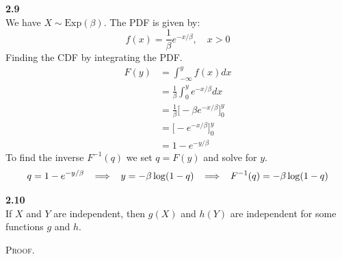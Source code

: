 \bigskip\noindent
\textbf{2.9}\\  %
We have $X\sim \text{Exp}(\beta)$. The PDF is given by:
$$
f(x) = \frac{1}{\beta}e^{-x/\beta},\quad x > 0
$$
Finding the CDF by integrating the PDF.
\begin{align*}
    F(y) &= \int_{-\infty}^y f(x)dx \\
    &= \frac{1}{\beta}\int_0^y e^{-x/\beta}dx\\
    &= \frac{1}{\beta}\big[-\beta e^{-x/\beta}\big]_0^y\\
    &= \big[-e^{-x/\beta}\big]_0^y \\
    &= 1 - e^{-y/\beta}
\end{align*}
To find the inverse $F^{-1}(q)$ we set $q = F(y)$ and solve for $y$.
$$
q = 1 - e^{-y/\beta}
\;\;\implies\;\;
y = -\beta\log(1 - q)
\;\;\implies\;\;
F^{-1}(q) = -\beta\log(1 - q)
$$

\bigskip\noindent
\textbf{2.10}\\  %
If $X$ and $Y$ are independent, then $g(X)$ and $h(Y)$ are independent for some functions
$g$ and $h$.

\medskip\noindent
\textsc{Proof}.















